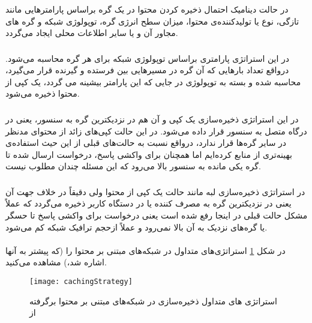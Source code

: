 در حالت دینامیک احتمال ذخیره کردن محتوا در یک گره براساس پارامترهایی مانند تازگی،‌ نوع یا تولیدکننده‌ی محتوا، میزان سطح انرژی گره، توپولوژی شبکه و گره های مجاور آن و یا سایر اطلاعات محلی ایجاد می‌گردد.

\subsubsection{}
در این استراتژی پارامتری براساس توپولوژی شبکه برای هر گره محاسبه می‌شود. درواقع تعداد بارهایی که آن گره در مسیرهایی بین فرستده و گیرنده قرار می‌گیرد، محاسبه شده و بسته به توپولوژی در جایی که این پارامتر بیشینه می گردد،‌ یک کپی از محتوا ذخیره می‌شود.

\subsubsection{}
در این استراتژی ذخیره‌سازی یک کپی و آن هم در نزدیکترین گره به سنسور، یعنی در درگاه متصل به سنسور قرار داده می‌شود. در این حالت کپی‌های زائد از محتوای مدنظر در سایر گره‌ها قرار ندارد، درواقع نسبت به حالت‌های قبلی از این حیث استفاده‌ی بهینه‌تری از منابع کرده‌ایم اما همچنان برای واکشی پاسخ، درخواست ارسال شده تا گره یکی مانده به سنسور بالا می‌رود که این مسئله چندان مطلوب نیست.

\subsubsection{}
در استراتژی ذخیره‌سازی لبه مانند حالت  یک کپی از محتوا ولی دقیقاً در خلاف جهت آن یعنی در نزدیکترین گره به مصرف کننده یا در دستگاه کاربر ذخیره می‌گردد که عملاً مشکل حالت قبلی در اینجا رفع شده است یعنی درخواست برای واکشی پاسخ تا حسگر یا گره‌های نزدیک به آن بالا نمی‌رود و عملاً ازحجم ترافیک شبکه کم می‌شود.

\paragraph{}
در شکل \ref{fig:cachingStrategy} استراتژی‌های متداول در شبکه‌های مبتنی بر محتوا را (که پیشتر به آنها اشاره شد،) مشاهده می‌کنید.
\begin{figure}[ht]
	\centerline{\texttt{[image: cachingStrategy]}}
	\caption{استراتژی های متداول ذخیره‌سازی در شبکه‌های مبتنی بر محتوا برگرفته از\\ }
	\label{fig:cachingStrategy}
\end{figure}

